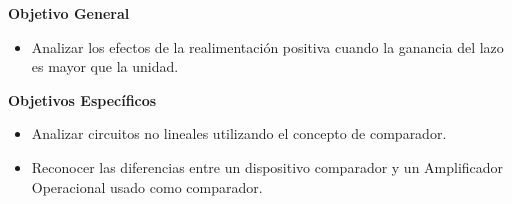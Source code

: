 \textbf{Objetivo General}

\begin{itemize}
    \item Analizar los efectos de la realimentación positiva cuando la ganancia del lazo es mayor que la unidad.
\end{itemize}

\textbf{Objetivos Específicos}

\begin{itemize}
    \item Analizar circuitos no lineales utilizando el concepto de comparador.
    \item Reconocer las diferencias entre un dispositivo comparador  y un Amplificador Operacional usado como comparador.
\end{itemize}
